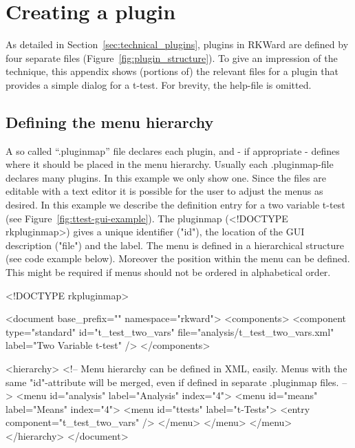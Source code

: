 \section{Creating a plugin}
\label{sec:example_plugin}
As detailed in Section~\ref{sec:technical_plugins}, plugins in RKWard are
defined by four separate files (Figure~\ref{fig:plugin_structure}). To give an impression of the technique,
this appendix shows (portions of) the relevant files for a plugin that provides
a simple dialog for a t-test. For brevity, the help-file is omitted.

\subsection{Defining the menu hierarchy}
\label{sec:defining_menu_hierarchy}
A so called ``.pluginmap'' file declares each plugin, and - if appropriate - defines where it should
be placed in the menu hierarchy. Usually each .pluginmap-file declares many plugins. In this example
we only show one. Since the files are editable with a text editor it is possible for the user to adjust
the menus as desired.
In this example we describe the definition entry for a two variable t-test (see Figure~\ref{fig:ttest-gui-example}). 
The pluginmap (<!DOCTYPE rkpluginmap>) gives a unique identifier ("id"), the location of the GUI description ("file") and the label. The menu
is defined in a hierarchical structure (see code example below). Moreover the position within the menu can be defined.
This might be required if menus should not be ordered in alphabetical order.

\begin{Code}
<!DOCTYPE rkpluginmap>

<document base_prefix="" namespace="rkward">
  <components>
    <component type="standard" id="t_test_two_vars" file="analysis/t_test_two_vars.xml" label="Two Variable t-test" />
  </components>

  <hierarchy>
    <!-- Menu hierarchy can be defined in XML, easily.
    Menus with the same "id"-attribute will be merged, even if defined in
    separate .pluginmap files. -->
    <menu id="analysis" label="Analysis" index="4">
      <menu id="means" label="Means" index="4">
        <menu id="ttests" label="t-Tests">
          <entry component="t_test_two_vars" />
        </menu>
      </menu>
    </menu>
  </hierarchy>
</document>
\end{Code}


